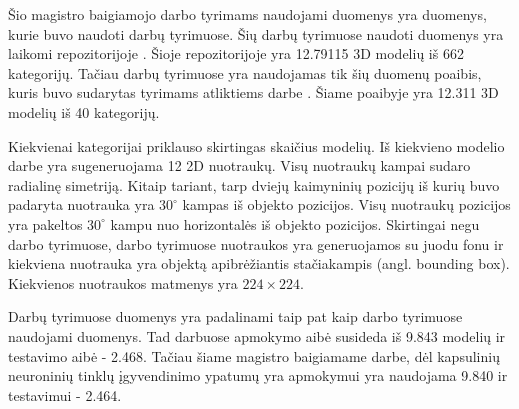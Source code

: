 Šio magistro baigiamojo darbo tyrimams naudojami duomenys yra duomenys, kurie buvo naudoti darbų \cite{cnnExp1, cnnExp2} tyrimuose. Šių darbų tyrimuose naudoti duomenys yra laikomi repozitorijoje \cite{dataRepo}. Šioje repozitorijoje yra 12.79115 3D modelių iš 662 kategorijų. Tačiau darbų \cite{cnnExp1, cnnExp2} tyrimuose yra naudojamas tik šių duomenų poaibis, kuris buvo sudarytas tyrimams atliktiems darbe \cite{dbnExp}. Šiame poaibyje yra 12.311 3D modelių iš 40 kategorijų.

Kiekvienai kategorijai priklauso skirtingas skaičius modelių. Iš kiekvieno modelio darbe \cite{cnnExp2} yra sugeneruojama 12 2D nuotraukų. Visų nuotraukų kampai sudaro radialinę simetriją. Kitaip tariant, tarp dviejų kaimyninių pozicijų iš kurių buvo padaryta nuotrauka yra $30^{\circ}$ kampas iš objekto pozicijos. Visų nuotraukų pozicijos yra pakeltos $30^{\circ}$ kampu nuo horizontalės iš objekto pozicijos. Skirtingai negu darbo \cite{dbnExp} tyrimuose, darbo \cite{cnnExp2} tyrimuose nuotraukos yra generuojamos su juodu fonu ir kiekviena nuotrauka yra objektą apibrėžiantis stačiakampis (angl. bounding box). Kiekvienos nuotraukos matmenys yra $224\times224$.

Darbų \cite{cnnExp1, cnnExp2} tyrimuose duomenys yra padalinami taip pat kaip darbo \cite{dbnExp} tyrimuose naudojami duomenys. Tad darbuose \cite{cnnExp1, cnnExp2, dbnExp} apmokymo aibė susideda iš 9.843 modelių ir testavimo aibė - 2.468. Tačiau šiame magistro baigiamame darbe, dėl kapsulinių neuroninių tinklų įgyvendinimo ypatumų yra apmokymui yra naudojama 9.840 ir testavimui - 2.464.
